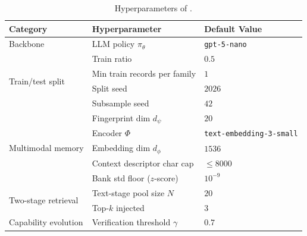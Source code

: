 \begin{table}[t]
\centering
\small
\caption{Hyperparameters of \method.}
\label{tab:hparams}
\begin{tabular}{lll}
\toprule
\textbf{Category} & \textbf{Hyperparameter} & \textbf{Default Value} \\
\midrule
Backbone
& LLM policy $\pi_\theta$              & \texttt{gpt-5-nano} \\
\midrule
\multirow{4}{*}{Train/test split}
& Train ratio                          & $0.5$ \\
& Min train records per family         & $1$ \\
& Split seed                           & $2026$ \\
& Subsample seed                       & $42$ \\
\midrule
\multirow{5}{*}{Multimodal memory}
& Fingerprint dim $d_\psi$             & $20$ \\
& Encoder $\Phi$                       & \texttt{text-embedding-3-small} \\
& Embedding dim $d_\phi$               & $1536$ \\
& Context descriptor char cap          & $\le 8000$ \\
& Bank std floor ($z$-score)           & $10^{-9}$ \\
\midrule
\multirow{2}{*}{Two-stage retrieval}
& Text-stage pool size $N$             & $20$ \\
& Top-$k$ injected                     & $3$ \\
\midrule
Capability evolution
& Verification threshold $\gamma$      & $0.7$ \\
\bottomrule
\end{tabular}
\end{table}